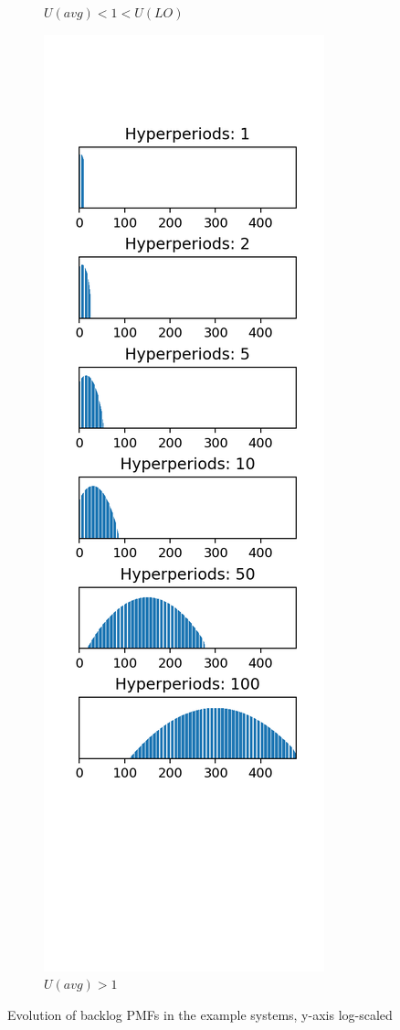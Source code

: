 \documentclass[a4paper,oneside]{csthesis}
\begin{document}
\begin{figure}[p]
\begin{subfigure}[c]{0.3\textwidth}
        \caption{$U(avg) < 1 < U(LO)$}\label{subfig:backlogs1}
    \end{subfigure}
    \quad
    \begin{subfigure}[c]{0.3\textwidth}
        \includegraphics[width=\textwidth]{figures/ex_backlogs2.png}
        \caption{$U(avg) > 1$}\label{subfig:backlogs2}
    \end{subfigure}
    \caption{Evolution of backlog PMFs in the example systems, y-axis log-scaled}\label{fig:backlogs}
\end{figure}
\end{document}
